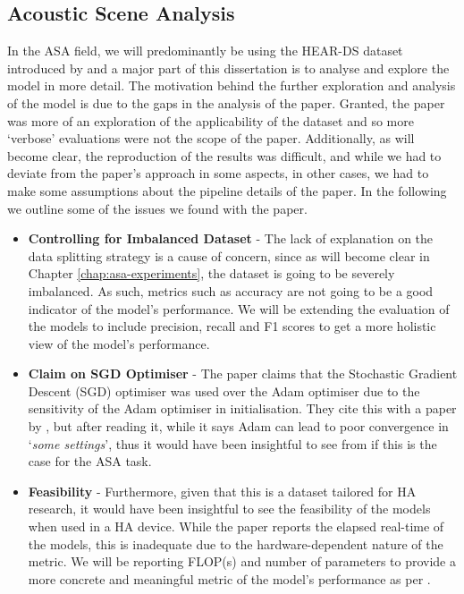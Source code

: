 \documentclass[logo,bsc,singlespacing,parskip,online]{infthesis}
\begin{document}
\subsection{Acoustic Scene Analysis}
In the ASA field, we will predominantly be using the HEAR-DS dataset introduced by \citet{Huwel2020HearDS}
and a major part of this dissertation is to analyse and explore the model in more detail.
The motivation behind the further exploration and analysis of the model is due
to the gaps in the analysis of the paper. Granted, the paper was more of an exploration of the applicability of the dataset 
and so more `verbose' evaluations were not the scope of the paper. 
Additionally, as will become clear, the reproduction of the results 
was difficult, and while we had to deviate from the paper's approach
in some aspects, in other cases, we had to make some assumptions
about the pipeline details of the paper. 
In the following we outline some of the issues we found with the paper.
\begin{itemize}
   \item \textbf{Controlling for Imbalanced Dataset} - The lack of explanation on the data splitting strategy 
   is a cause of concern, since as will become clear in Chapter \ref{chap:asa-experiments},
   the dataset is going to be severely imbalanced. As such, metrics such as accuracy are not going to be a good 
   indicator of the model's performance. We will be extending the evaluation of the models to include 
   precision, recall and F1 scores to get a more holistic view of the model's performance. 
   \item \textbf{Claim on SGD Optimiser} - The paper claims that the Stochastic Gradient Descent (SGD) 
   optimiser was used over the Adam optimiser due to the sensitivity of the Adam optimiser in 
   initialisation. They cite this with a paper by \citet{Reddi2019convergenceadam},
   but after reading it, while it says 
   Adam can lead to poor convergence in `\textit{some settings}',
   thus it would have been insightful to see from \citet{Huwel2020HearDS}
   if this is the case for the ASA task.
   \item \textbf{Feasibility} - Furthermore, given that 
   this is a dataset tailored for HA research, it would have been insightful 
   to see the feasibility of the models when used in a HA device. While the paper 
   reports the elapsed real-time of the models, this
   is inadequate due to the hardware-dependent nature of the metric. 
   We will be reporting FLOP(s) and number of parameters to provide a more 
   concrete and meaningful metric of the model's performance as per \citet{schwartz2019greenai}.
\end{itemize}
\end{document}
